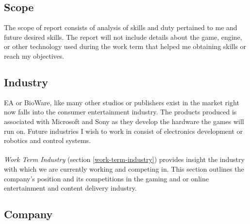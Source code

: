 \documentclass[10pt,letterpaper]{article}
\begin{document}
\subsection{Scope}\label{introduction-scope}

The scope of report consists of analysis of skills and duty pertained to me and future desired skills. The report will not include details about the game, engine, or other technology used during the work term that helped me obtaining skills or reach my objectives.

\subsection{Industry}\label{introduction-industry}

EA or BioWare, like many other studios or publishers exist in the market right now  falls into the consumer entertainment industry. The products produced is associated with Microsoft and Sony as they develop the hardware the games will run on. Future industries I wish to work in consist of electronics development or robotics and control systems.\\
\\
\textit{Work Term Industry} (section \ref{work-term-industry}) provides insight the industry with which we are currently working and competing in. This section outlines the company's position and its competitions in the gaming and or online entertainment and content delivery industry.

\subsection{Company}\label{introduction-company}
\end{document}
